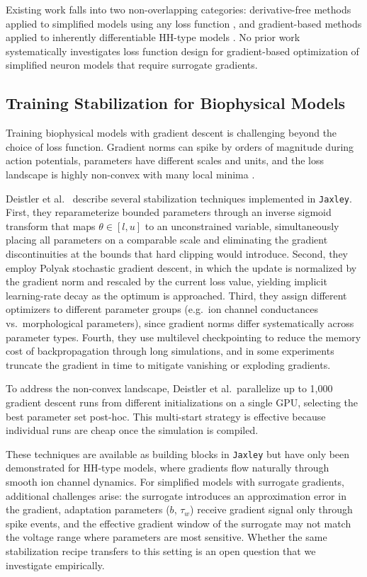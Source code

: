 Existing work falls into two non-overlapping categories: derivative-free methods applied to simplified models using any loss function \cite{Guarino2025, Marin2020, Cruz2021}, and gradient-based methods applied to inherently differentiable \gls{HH}-type models \cite{Deistler2025, Jones2024}.
No prior work systematically investigates loss function design for gradient-based optimization of simplified neuron models that require surrogate gradients.

\subsection{Training Stabilization for Biophysical Models}\label{sec:rw:training-stab}

Training biophysical models with gradient descent is challenging beyond the choice of loss function.
Gradient norms can spike by orders of magnitude during action potentials, parameters have different scales and units, and the loss landscape is highly non-convex with many local minima \cite{Deistler2025}.

Deistler et al.\ \cite{Deistler2025} describe several stabilization techniques implemented in \texttt{Jaxley}.
First, they reparameterize bounded parameters through an inverse sigmoid transform that maps $\theta \in [l, u]$ to an unconstrained variable, simultaneously placing all parameters on a comparable scale and eliminating the gradient discontinuities at the bounds that hard clipping would introduce.
Second, they employ Polyak stochastic gradient descent, in which the update is normalized by the gradient norm and rescaled by the current loss value, yielding implicit learning-rate decay as the optimum is approached.
Third, they assign different optimizers to different parameter groups (e.g.\ ion channel conductances vs.\ morphological parameters), since gradient norms differ systematically across parameter types.
Fourth, they use multilevel checkpointing to reduce the memory cost of backpropagation through long simulations, and in some experiments truncate the gradient in time to mitigate vanishing or exploding gradients.

To address the non-convex landscape, Deistler et al.\ parallelize up to 1,000 gradient descent runs from different initializations on a single GPU, selecting the best parameter set post-hoc.
This multi-start strategy is effective because individual runs are cheap once the simulation is compiled.

These techniques are available as building blocks in \texttt{Jaxley} but have only been demonstrated for \gls{HH}-type models, where gradients flow naturally through smooth ion channel dynamics.
For simplified models with surrogate gradients, additional challenges arise: the surrogate introduces an approximation error in the gradient, adaptation parameters ($b$, $\tau_w$) receive gradient signal only through spike events, and the effective gradient window of the surrogate may not match the voltage range where parameters are most sensitive.
Whether the same stabilization recipe transfers to this setting is an open question that we investigate empirically.


